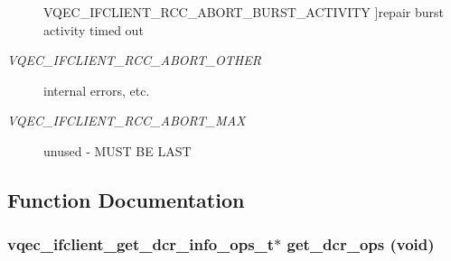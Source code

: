 \begin{Desc}
\begin{description}
{VQEC\_\-IFCLIENT\_\-RCC\_\-ABORT\_\-BURST\_\-ACTIVITY\label{group__structs_ggb58f0c6f9cdc41f1f4aaf23ef43facbe72ef67e9f1b2a205999530b3f3ff0a2f}
}]repair burst activity timed out \item[{\em 
VQEC\_\-IFCLIENT\_\-RCC\_\-ABORT\_\-OTHER\label{group__structs_ggb58f0c6f9cdc41f1f4aaf23ef43facbe6c4362a3ddb0f23f86e3e3f3b389e67c}
}]internal errors, etc. \item[{\em 
VQEC\_\-IFCLIENT\_\-RCC\_\-ABORT\_\-MAX\label{group__structs_ggb58f0c6f9cdc41f1f4aaf23ef43facbe613aa45a60f76f3adb4c5f41e74d483d}
}]unused - MUST BE LAST \end{description}
\end{Desc}



\subsection{Function Documentation}
\subsubsection{\setlength{\rightskip}{0pt plus 5cm}\bf{vqec\_\-ifclient\_\-get\_\-dcr\_\-info\_\-ops\_\-t}$\ast$ get\_\-dcr\_\-ops (void)}\label{group__structs_gf17628598db78c225bf8811e1a8b5acc}


